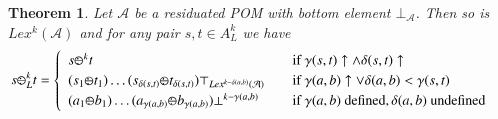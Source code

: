 \documentclass[a4paper]{elsarticle}
\newtheorem{remark}{Remark}
\newtheorem{theorem}{Theorem}
\newcommand{\1}{\mathbf{1}}
\def\odiv{{ \ominus\hspace{-8pt}:}\;}
\begin{document}
\begin{theorem}\label{prop:lexiRes}
	Let $\mathcal{A}$ be a residuated POM with bottom
	element $\bot_\mathcal{A}$.
	Then so is $Lex^k(\mathcal{A})$ and for any pair
	$s , t \in A^k_L$ we have
	\[
	s \odiv^k_L t = 	\begin{cases}
	\begin{array}{lcl}
	s \odiv^k t & & \mbox{if  } \gamma(s,t) \uparrow \wedge \delta(s,t) \uparrow \\
	(s_1 \odiv t_1) \ldots  (s_{\delta(s, t)}  \odiv t_{\delta(s, t)})
	\top_{Lex^{k-\delta(a,b)}(\mathcal{A})} & &  \mbox{if  } \gamma(a,b) \uparrow \vee \delta(a,b) < \gamma(s,t) \\
	(a_1 \odiv b_1) \ldots  (a_{\gamma(a, b)}  \odiv b_{\gamma(a, b)}) 	
	\bot^{k - \gamma(a, b)} & & \mbox{if  } \gamma(a,b) \mbox { defined}, \delta(a,b) \mbox { undefined}
	\end{array}
	\end{cases}
	\]
\end{theorem}

\end{document}
